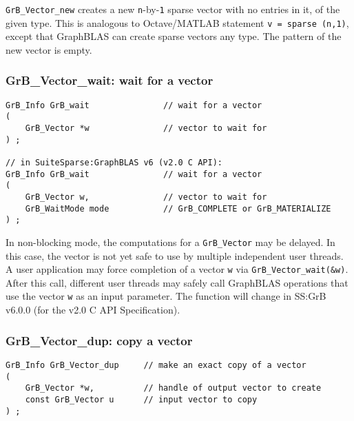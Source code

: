 \documentclass[12pt]{article}
\begin{document}
\verb'GrB_Vector_new' creates a new \verb'n'-by-\verb'1' sparse vector with no
entries in it, of the given type.  This is analogous to Octave/MATLAB statement
\verb'v = sparse (n,1)', except that GraphBLAS can create sparse vectors any
type.  The pattern of the new vector is empty.

\subsubsection{{\sf GrB\_Vector\_wait:} wait for a vector}
\label{vector_wait}

\begin{mdframed}[userdefinedwidth=6in]
{\footnotesize
\begin{verbatim}
GrB_Info GrB_wait               // wait for a vector
(
    GrB_Vector *w               // vector to wait for
) ;

// in SuiteSparse:GraphBLAS v6 (v2.0 C API):
GrB_Info GrB_wait               // wait for a vector
(
    GrB_Vector w,               // vector to wait for
    GrB_WaitMode mode           // GrB_COMPLETE or GrB_MATERIALIZE
) ;
\end{verbatim}
}\end{mdframed}

In non-blocking mode, the computations for a \verb'GrB_Vector' may be delayed.
In this case, the vector is not yet safe to use by multiple independent user
threads.  A user application may force completion of a vector \verb'w' via
\verb'GrB_Vector_wait(&w)'.  After this call, different user threads may safely
call GraphBLAS operations that use the vector \verb'w' as an input parameter.
The function will change in SS:GrB v6.0.0 (for the v2.0 C API Specification).

\subsubsection{{\sf GrB\_Vector\_dup:}           copy a vector}
\label{vector_dup}

\begin{mdframed}[userdefinedwidth=6in]
{\footnotesize
\begin{verbatim}
GrB_Info GrB_Vector_dup     // make an exact copy of a vector
(
    GrB_Vector *w,          // handle of output vector to create
    const GrB_Vector u      // input vector to copy
) ;
\end{verbatim}
} \end{mdframed}
\end{document}
